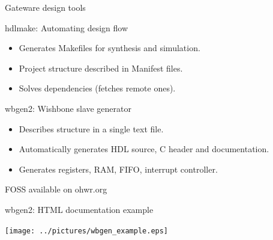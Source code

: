 \documentclass[compress,red]{beamer}
\begin{document}
\begin{frame}{Gateware design tools}

  \begin{block}{hdlmake: Automating design flow}
    \begin{itemize}
    \item Generates Makefiles for synthesis and simulation.
    \item Project structure described in Manifest files.
    \item Solves dependencies (fetches remote ones).
    \end{itemize}
  \end{block}

  \begin{block}{wbgen2: Wishbone slave generator}
    \begin{itemize}
    \item Describes structure in a single text file.
    \item Automatically generates HDL source, C header and documentation.
    \item Generates registers, RAM, FIFO, interrupt controller.
    \end{itemize}
  \end{block}

  \begin{block}{}
    \begin{center}
      FOSS available on ohwr.org
    \end{center}
  \end{block}

  \note[item]{}

\end{frame}

\begin{frame}{wbgen2: HTML documentation example}

  \begin{center}
    \texttt{[image: ../pictures/wbgen\_example.eps]}
  \end{center}


\end{frame}
\end{document}
